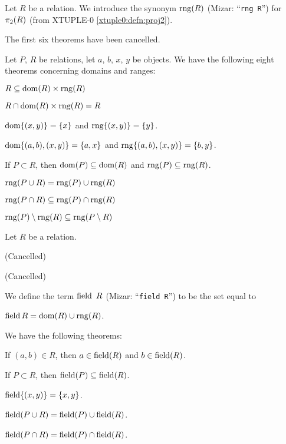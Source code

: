 \documentclass{article}
\begin{document}
\begin{notation}
Let $R$ be a relation. We introduce the synonym $\operatorname{rng}(R)$ (Mizar:
``\verb#rng R#'') for $\pi_{2}(R)$ (from XTUPLE-0 \eqref{xtuple0:defn:proj2}).
\end{notation}

The first six theorems have been cancelled.

Let $P$, $R$ be relations, let $a$, $b$, $x$, $y$ be objects.
We have the following eight theorems concerning domains and ranges:
\begin{thm}\setcounter{thmi}{6}
\item\label{relat1:7} $R\subseteq\operatorname{dom}(R)\times\operatorname{rng}(R)$
\item\label{relat1:8} $R\cap\operatorname{dom}(R)\times\operatorname{rng}(R)=R$
\item\label{relat1:9} $\operatorname{dom}\{(x,y)\}=\{x\}$ and
  $\operatorname{rng}\{(x,y)\}=\{y\}$.
\item\label{relat1:10} $\operatorname{dom}\{(a,b), (x,y)\}=\{a,x\}$ and
  $\operatorname{rng}\{(a,b),(x,y)\}=\{b,y\}$.
\item\label{relat1:11} If $P\subset R$, then $\operatorname{dom}(P)\subseteq\operatorname{dom}(R)$ and
  $\operatorname{rng}(P)\subseteq\operatorname{rng}(R)$. 
\item\label{relat1:12} $\operatorname{rng}(P\cup R)=\operatorname{rng}(P)\cup\operatorname{rng}(R)$
\item\label{relat1:13} $\operatorname{rng}(P\cap R)\subseteq\operatorname{rng}(P)\cap\operatorname{rng}(R)$
\item\label{relat1:14} $\operatorname{rng}(P)\setminus\operatorname{rng}(R)\subseteq\operatorname{rng}(P\setminus R)$
\end{thm}

\begin{definition}
Let $R$ be a relation.
\begin{defn}
\item (Cancelled)
\item (Cancelled)
\end{defn}
We define the term $\operatorname{field}\ R$ (Mizar: ``\verb#field R#'') to be the set
equal to
\begin{defn}
\item $\operatorname{field} R=\operatorname{dom}(R)\cup\operatorname{rng}(R)$.
\end{defn}
\end{definition}

We have the following theorems:
\begin{thm}
\item\label{relat1:15} If $(a,b)\in R$, then $a\in\operatorname{field}(R)$ and $b\in\operatorname{field}(R)$.
\item\label{relat1:16} If $P\subset R$, then $\operatorname{field}(P)\subseteq\operatorname{field}(R)$.
\item\label{relat1:17} $\operatorname{field}\{(x,y)\}=\{x,y\}$.
\item\label{relat1:18} $\operatorname{field}(P\cup R)=\operatorname{field}(P)\cup\operatorname{field}(R)$.
\item\label{relat1:19} $\operatorname{field}(P\cap R)=\operatorname{field}(P)\cap\operatorname{field}(R)$.
\end{thm}
\end{document}
